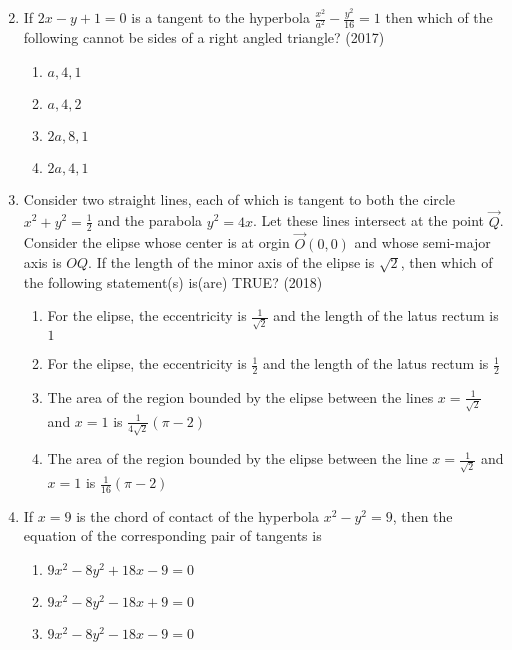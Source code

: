 \begin{enumerate}[label=\thesubsection.\arabic*.,ref=\thesubsection.\theenumi]
\begin{multicols}{2}
\begin{enumerate}
	       \end{enumerate}
\end{multicols}
      \item If $2x-y+1=0$ is a tangent to the hyperbola $\frac{x^2}{a^2}-\frac{y^2}{16}=1$ then which of the following cannot be sides of a right angled triangle? 
	      \hfill(2017)
	       \begin{multicols}{4}
\begin{enumerate}
		      \item $a,4,1$
		      \item $a,4,2$
		      \item $2a,8,1$
		      \item $2a,4,1$
	       \end{enumerate}
\end{multicols}
%
      \item Consider two straight lines, each of which is tangent to both the circle $x^2+y^2=\frac{1}{2}$
	      and the parabola $y^2=4x$. Let these lines intersect at the point $\vec{Q}$. Consider the elipse whose center is at orgin $\vec{O}(0,0)$ and whose semi-major axis is $OQ$.
	      If the length of the minor axis of the elipse is $\sqrt{2}$, then which of the following statement(s) is(are) TRUE? 
	      \hfill(2018)
%	      
\begin{enumerate}
		      \item For the elipse, the eccentricity is $\frac{1}{\sqrt{2}}$ and the length of the latus rectum is $1$
%
		      \item For the elipse, the eccentricity is $\frac{1}{2}$ and the length of the latus rectum is $\frac{1}{2}$
		      \item The area of the region bounded by the elipse between the lines $x=\frac{1}{\sqrt{2}}$ and $x=1$ is $\frac{1}{4\sqrt{2}}(\pi-2)$
		      \item The area of the region bounded by the elipse between the line $x=\frac{1}{\sqrt{2}}$ and $x=1$ is $\frac{1}{16}(\pi-2)$
	       \end{enumerate}
%
\item If $x=9$ is the chord of contact of the hyperbola $x^2-y^2=9$, then the equation of the corresponding pair of tangents is
    \hfill {}
\begin{multicols}{2}
\begin{enumerate}
    \item $9x^2-8y^2+18x-9=0$
    \item $9x^2-8y^2-18x+9=0$
    \item $9x^2-8y^2-18x-9=0$

\end{enumerate}
\end{multicols}
\end{enumerate}
